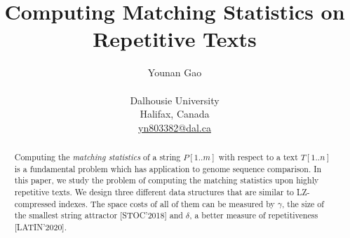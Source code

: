 \documentclass[smallabstract,smallcaptions]{dccpaper}
\begin{document}
	
	\title
	{\large
		\textbf{Computing Matching Statistics on Repetitive Texts}
	}
	
	
	\author{%
		Younan Gao\\[0.5em]
		{\small\begin{minipage}{\linewidth}\begin{center}
					\begin{tabular}{c}
						Dalhousie University \\
						Halifax, Canada\\
						\url{yn803382@dal.ca}
					\end{tabular}
		\end{center}\end{minipage}}
	}
	
	
	\maketitle
	\thispagestyle{empty}
	
	
	\begin{abstract}
		Computing the {\em matching statistics} of a string $P[1..m]$ with respect to a text $T[1..n]$ is a fundamental problem which has application to genome sequence comparison.
		In this paper, we study the problem of computing the matching statistics upon highly repetitive texts.
		We design three different data structures that are similar to LZ-compressed indexes. 
		The space costs of all of them can be measured by $\gamma$, the size of the smallest string attractor [STOC'2018] and $\delta$, a better measure of repetitiveness  [LATIN'2020]. 	
	\end{abstract}
	
\end{document}
